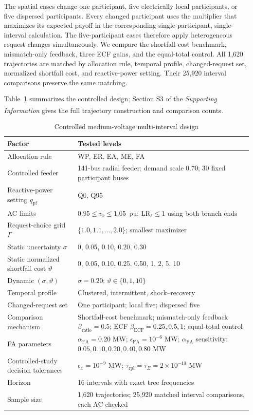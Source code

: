 \documentclass[twoside,twocolumn,9pt]{article}
\newcommand{\suppref}{\textit{Supporting Information}\textsuperscript{\dag}}
\begin{document}
{The spatial cases change one participant, five electrically local participants,
or five dispersed participants. Every changed participant uses the multiplier
that maximizes its expected payoff in the corresponding single-participant,
single-interval calculation. The
five-participant cases therefore apply heterogeneous request changes
simultaneously. We compare the shortfall-cost benchmark, mismatch-only
feedback, three ECF gains, and the equal-total control. All 1,620 trajectories
are matched by allocation rule, temporal profile, changed-request set,
normalized shortfall cost, and reactive-power setting. Their 25,920 interval
comparisons preserve the same matching.

Table~\ref{tab:behavior_design} summarizes the controlled design; Section S3
of the \suppref{} gives the full trajectory construction and comparison counts.

\begin{table}[!t]
\caption{Controlled medium-voltage multi-interval design}
\label{tab:behavior_design}
\centering
\scriptsize
\setlength{\tabcolsep}{3.0pt}
\begin{tabularx}{\columnwidth}{@{}lX@{}}
\hline
Factor & Tested levels \\
\hline
Allocation rule & WP, ER, EA, ME, FA \\
Controlled feeder & 141-bus radial feeder; demand scale 0.70; 30 fixed participant buses \\
Reactive-power setting $q_{\mathrm{pf}}$ & Q0, Q95 \\
AC limits & $0.95\le v_b\le1.05$~pu; $\mathrm{LR}_\ell\le1$ using both branch ends \\
Request-choice grid $\Gamma$ & $\{1.0,1.1,\ldots,2.0\}$; smallest maximizer \\
Static uncertainty $\sigma$ & 0, 0.05, 0.10, 0.20, 0.30 \\
Static normalized shortfall cost $\vartheta$ & 0, 0.05, 0.10, 0.25, 0.50, 1, 2, 5, 10 \\
Dynamic $(\sigma,\vartheta)$ & $\sigma=0.20$; $\vartheta\in\{0,1,10\}$ \\
Temporal profile & Clustered, intermittent, shock--recovery \\
Changed-request set & One participant; local five; dispersed five \\
Comparison mechanism & Shortfall-cost benchmark; mismatch-only feedback $\beta_{\mathrm{ratio}}=0.5$; ECF $\beta_{\mathrm{ECF}}=0.25,0.5,1$; equal-total control \\
FA parameters & $\alpha_{\mathrm{FA}}=0.20$ MW; $\epsilon_{\mathrm{FA}}=10^{-6}$ MW; $\alpha_{\mathrm{FA}}$ sensitivity: $0.05,0.10,0.20,0.40,0.80$ MW \\
Controlled-study decision tolerances & $\epsilon_x=10^{-9}$ MW; $\tau_{\mathrm{rpl}}=\tau_E=2\times10^{-10}$ MW \\
Horizon & 16 intervals with exact tree frequencies \\
Sample size & 1,620 trajectories; 25,920 matched interval comparisons, each AC-checked \\
\hline
\end{tabularx}
\end{table}

}
\end{document}
